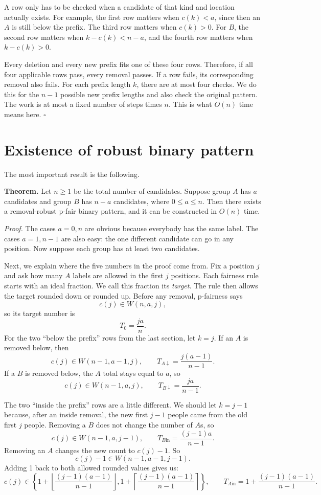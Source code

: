 \documentclass[11pt]{article}
\newcommand{\floor}[1]{\left\lfloor #1\right\rfloor}
\newcommand{\ceil}[1]{\left\lceil #1\right\rceil}
\begin{document}
A row only has to be checked when a candidate of that kind and location
actually exists.  For example, the first row matters when $c(k)<a$, since
then an $A$ is still below the prefix.  The third row matters when $c(k)>0$.
For $B$, the second row matters when $k-c(k)<n-a$, and the fourth row matters
when $k-c(k)>0$.

Every deletion and every new prefix fits one of these four rows.  Therefore,
if all four applicable rows pass, every removal passes.  If a row fails, its
corresponding removal also fails.  For each prefix length $k$, there are at
most four checks.  We do this for the $n-1$ possible new prefix lengths and
also check the original pattern.  The work is at most a fixed number of steps
times $n$.  This is what $O(n)$ time means here. \hfill\(\square\)

\section{Existence of robust binary pattern}

The most important result is the following.

\medskip
\noindent\textbf{Theorem.}
Let $n\ge1$ be the total number of candidates.  Suppose group $A$ has $a$
candidates and group $B$ has $n-a$ candidates, where $0\le a\le n$.  Then
there exists a removal-robust p-fair binary pattern, and it can be constructed in $O(n)$ time.
\medskip

\noindent\textit{Proof.}
The cases $a=0,n$ are obvious because everybody has the same label.  The
cases $a=1,n-1$ are also easy: the one different candidate can go in any
position.  Now suppose each group has at least two candidates.

Next, we explain where the five numbers in the proof come from.  Fix a
position $j$ and ask how many $A$ labels are allowed in the first $j$
positions.  Each fairness rule starts with an ideal fraction.  We call this
fraction its \emph{target}.  The rule then allows the target rounded down or
rounded up.  Before any removal, p-fairness says
\[
 c(j)\in W(n,a,j),
\]
so its target number is
\[
 T_0=\frac{ja}{n}.
\]
For the two ``below the prefix'' rows from the last section, let $k=j$.
If an $A$ is removed below, then
\[
 c(j)\in W(n-1,a-1,j),
 \qquad T_{A\downarrow}=\frac{j(a-1)}{n-1}.
\]
If a $B$ is removed below, the $A$ total stays equal to $a$, so
\[
 c(j)\in W(n-1,a,j),
 \qquad T_{B\downarrow}=\frac{ja}{n-1}.
\]

The two ``inside the prefix'' rows are a little different.  We should let $k=j-1$
because, after an inside removal, the new first $j-1$ people came from the
old first $j$ people.  Removing a $B$ does not change the number of $A$s, so
\[
 c(j)\in W(n-1,a,j-1),
 \qquad T_{B\mathrm{in}}=\frac{(j-1)a}{n-1}.
\]
Removing an $A$ changes the new count to $c(j)-1$.  So
\[
 c(j)-1\in W(n-1,a-1,j-1).
\]
Adding 1 back to both allowed rounded values gives us:
\[
 c(j)\in
 \left\{1+\floor{\frac{(j-1)(a-1)}{n-1}},
             1+\ceil{\frac{(j-1)(a-1)}{n-1}}\right\},
 \qquad
 T_{A\mathrm{in}}=1+\frac{(j-1)(a-1)}{n-1}.
\]
\end{document}
